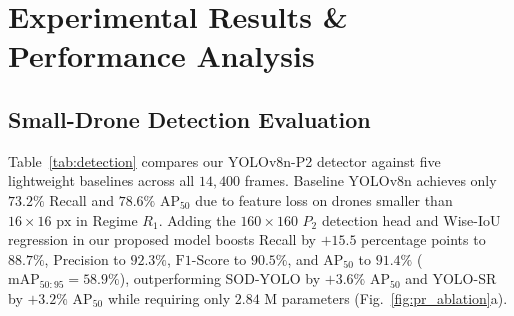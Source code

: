 \documentclass[conference]{IEEEtran}
\begin{document}
\begin{table}[!t]
\centering
\caption{Ablation Study of the Integrated Detection, Tracking, VIO Ego-Motion Compensation, and 3D CTRA-EKF Framework Across Regimes $R_1\text{--}R_4$.}
\label{tab:ablation}
\footnotesize
\renewcommand{\arraystretch}{1.15}
\end{table}

\section{Experimental Results \& Performance Analysis}

\subsection{Small-Drone Detection Evaluation}
Table~\ref{tab:detection} compares our YOLOv8n-P2 detector against five lightweight baselines across all $14,400$ frames. Baseline YOLOv8n achieves only $73.2\%$ Recall and $78.6\%$ $\text{AP}_{50}$ due to feature loss on drones smaller than $16 \times 16\text{ px}$ in Regime $R_1$. Adding the $160 \times 160$ $P_2$ detection head and Wise-IoU regression in our proposed model boosts Recall by $+15.5$ percentage points to $88.7\%$, Precision to $92.3\%$, $\text{F1-Score}$ to $90.5\%$, and $\text{AP}_{50}$ to $91.4\%$ ($\text{mAP}_{50:95} = 58.9\%$), outperforming SOD-YOLO \cite{ref3} by $+3.6\%$ $\text{AP}_{50}$ and YOLO-SR \cite{ref7} by $+3.2\%$ $\text{AP}_{50}$ while requiring only $2.84\text{ M}$ parameters (Fig.~\ref{fig:pr_ablation}a).
\end{document}
